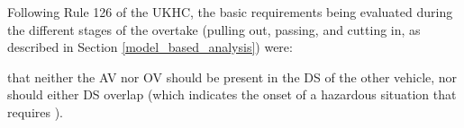 %
Following Rule 126 of the UKHC, the basic requirements being evaluated during the different stages of the overtake (pulling out, passing, and cutting in, as described in Section \ref{model_based_analysis}) were:

 that neither the AV nor OV should be present in the DS of the other vehicle, nor should either DS overlap (which indicates the onset of a hazardous situation that requires ). 
%
%


